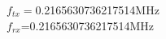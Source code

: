 \documentclass[preview]{standalone}
\begin{document}
\begin{center}
$f_{tx}=$0.2165630736217514MHz\\$f_{rx}$=0.2165630736217514MHz
\end{center}
\end{document}
